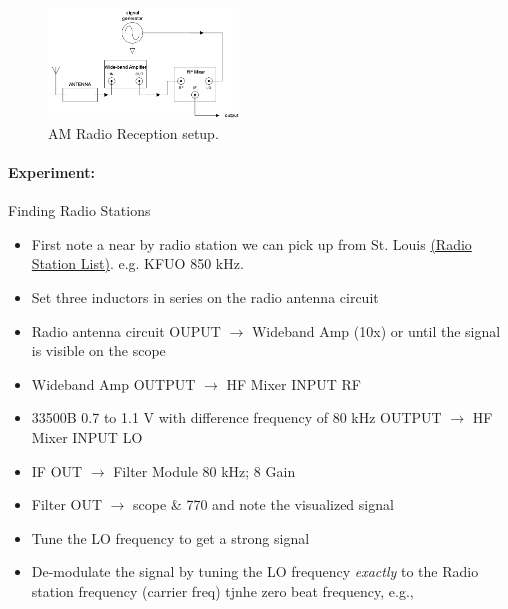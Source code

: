 \documentclass[../main.tex]{subfiles}
\begin{document}
\begin{figure}[ht]
    \centering
    \includegraphics[width=0.45\textwidth]{fig2_10.png}
    \captionsetup{width=0.8\textwidth}
    \caption{AM Radio Reception setup.}
    \label{fig:6}
\end{figure}

\paragraph*{Experiment:} Finding Radio Stations
\begin{itemize}
    \item First note a near by radio station we can pick up from St. Louis \href{https://radio-locator.com/cgi-bin/locate?select=city&city=saint+louis&state=mo&x=0&y=0}{(Radio Station List)}. e.g. KFUO 850 kHz.
    \item Set three inductors in series on the radio antenna circuit
    \item Radio antenna circuit OUPUT $\to$ Wideband Amp (10x) or until the signal is visible on the scope
    \item Wideband Amp OUTPUT $\to$ HF Mixer INPUT RF
    \item 33500B 0.7 to 1.1 V with difference frequency of 80 kHz OUTPUT $\to$ HF Mixer INPUT LO
    \item IF OUT $\to$ Filter Module 80 kHz; 8 Gain
    \item Filter OUT $\to$ scope \& 770 and note the visualized signal
    \item Tune the LO frequency to get a strong signal
    \item De-modulate the signal by tuning the LO frequency \textit{exactly} to the Radio station frequency (carrier freq) tjnhe zero beat frequency, e.g., 
\end{itemize}
\end{document}
